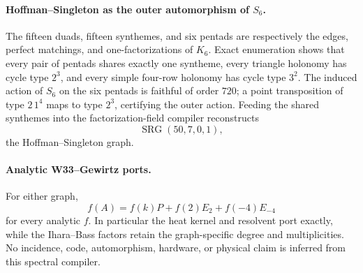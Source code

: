 \paragraph{Hoffman--Singleton as the outer automorphism of $S_6$.}
The fifteen duads, fifteen synthemes, and six pentads are respectively the edges, perfect matchings, and one-factorizations of $K_6$.  Exact enumeration shows that every pair of pentads shares exactly one syntheme, every triangle holonomy has cycle type $2^3$, and every simple four-row holonomy has cycle type $3^2$.  The induced action of $S_6$ on the six pentads is faithful of order $720$; a point transposition of type $2\,1^4$ maps to type $2^3$, certifying the outer action.  Feeding the shared synthemes into the factorization-field compiler reconstructs
\[
\operatorname{SRG}(50,7,0,1),
\]
the Hoffman--Singleton graph.

\paragraph{Analytic W33--Gewirtz ports.}
For either graph,
\[
f(A)=f(k)P+f(2)E_2+f(-4)E_{-4}
\]
for every analytic $f$.  In particular the heat kernel and resolvent port exactly, while the Ihara--Bass factors retain the graph-specific degree and multiplicities.  No incidence, code, automorphism, hardware, or physical claim is inferred from this spectral compiler.
